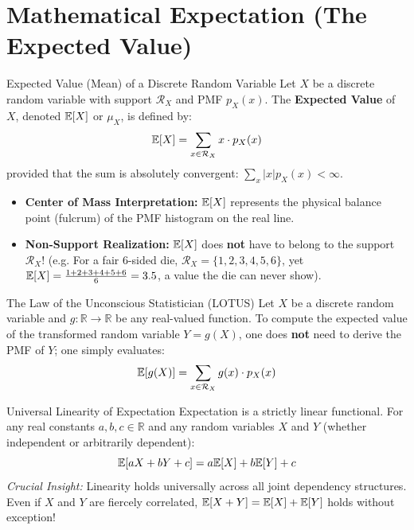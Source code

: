 \section{Mathematical Expectation (The Expected Value)}

\begin{definitionbox}{Expected Value (Mean) of a Discrete Random Variable}
Let $X$ be a discrete random variable with support $\mathcal{R}_X$ and PMF $p_X(x)$. The \textbf{Expected Value} of $X$, denoted $\mathbb{E}[X]$ or $\mu_X$, is defined by:
$$\mathbb{E}[X] = \sum_{x \in \mathcal{R}_X} x \cdot p_X(x)$$
provided that the sum is absolutely convergent: $\sum_{x} |x| p_X(x) < \infty$.
\begin{itemize}
    \item \textbf{Center of Mass Interpretation:} $\mathbb{E}[X]$ represents the physical balance point (fulcrum) of the PMF histogram on the real line.
    \item \textbf{Non-Support Realization:} $\mathbb{E}[X]$ does \textbf{not} have to belong to the support $\mathcal{R}_X$! (e.g. For a fair 6-sided die, $\mathcal{R}_X = \{1, 2, 3, 4, 5, 6\}$, yet $\mathbb{E}[X] = \frac{1+2+3+4+5+6}{6} = 3.5$, a value the die can never show).
\end{itemize}
\end{definitionbox}

\begin{theorembox}{The Law of the Unconscious Statistician (LOTUS)}
Let $X$ be a discrete random variable and $g \colon \mathbb{R} \to \mathbb{R}$ be any real-valued function. To compute the expected value of the transformed random variable $Y = g(X)$, one does \textbf{not} need to derive the PMF of $Y$; one simply evaluates:
$$\mathbb{E}[g(X)] = \sum_{x \in \mathcal{R}_X} g(x) \cdot p_X(x)$$
\end{theorembox}

\begin{theorembox}{Universal Linearity of Expectation}
Expectation is a strictly linear functional. For any real constants $a, b, c \in \mathbb{R}$ and any random variables $X$ and $Y$ (whether independent or arbitrarily dependent):
$$\mathbb{E}[aX + bY + c] = a\mathbb{E}[X] + b\mathbb{E}[Y] + c$$
\textit{Crucial Insight:} Linearity holds universally across all joint dependency structures. Even if $X$ and $Y$ are fiercely correlated, $\mathbb{E}[X + Y] = \mathbb{E}[X] + \mathbb{E}[Y]$ holds without exception!
\end{theorembox}

